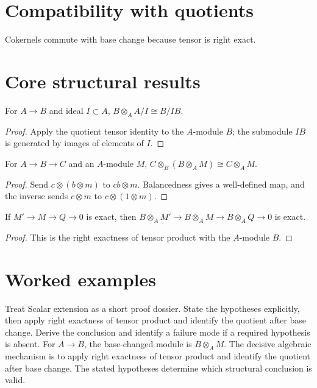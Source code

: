 \section{Compatibility with quotients}
Cokernels commute with base change because tensor is right exact.

\section{Core structural results}

\begin{theorem}\label{thm:v11-01}
For $A\to B$ and ideal $I\subset A$, $B\otimes_A A/I\cong B/IB$.
\begin{proof}
Apply the quotient tensor identity to the $A$-module $B$; the submodule $IB$ is generated by images of elements of $I$.
\end{proof}
\end{theorem}

\begin{theorem}\label{thm:v11-02}
For $A\to B\to C$ and an $A$-module $M$, $C\otimes_B(B\otimes_A M)\cong C\otimes_A M$.
\begin{proof}
Send $c\otimes(b\otimes m)$ to $cb\otimes m$. Balancedness gives a well-defined map, and the inverse sends $c\otimes m$ to $c\otimes(1\otimes m)$.
\end{proof}
\end{theorem}

\begin{theorem}\label{thm:v11-03}
If $M'\to M\to Q\to0$ is exact, then $B\otimes_A M'\to B\otimes_A M\to B\otimes_A Q\to0$ is exact.
\begin{proof}
This is the right exactness of tensor product with the $A$-module $B$.
\end{proof}
\end{theorem}

\section{Worked examples}

\begin{example}\label{ex:v11-worked-01}
Treat Scalar extension as a short proof dossier. State the hypotheses explicitly, then apply right exactness of tensor product and identify the quotient after base change. Derive the conclusion and identify a failure mode if a required hypothesis is absent. For $A\to B$, the base-changed module is $B\otimes_A M$. The decisive algebraic mechanism is to apply right exactness of tensor product and identify the quotient after base change. The stated hypotheses determine which structural conclusion is valid.
\end{example}

